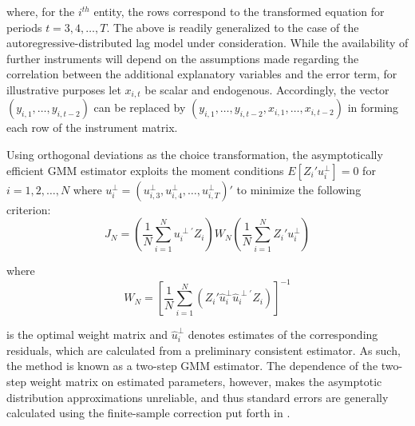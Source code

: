 \documentclass[english]{article}
\begin{document}
\noindent
where, for the $i^{th}$ entity, the rows correspond to the transformed 
equation for periods $t=3,4,\ldots,T$. 
The above is readily generalized to the case of the autoregressive-distributed 
lag model under consideration. 
While the availability of further instruments will depend on the assumptions 
made regarding the correlation between the additional explanatory variables 
and the error term, for illustrative purposes let $x_{i,t}$ be scalar and 
endogenous. 
Accordingly, the vector $(y_{i,1}, \ldots, y_{i,t-2})$ can be replaced by 
$(y_{i,1}, \ldots, y_{i,t-2}, x_{i,1},\ldots,  x_{i,t-2})$ in forming 
each row of the instrument matrix. 

Using orthogonal deviations as the choice transformation, the asymptotically 
efficient GMM estimator exploits the moment conditions 
$E[Z_i' u_i^\perp]=0$ for $i=1,2,\ldots,N$ where $u_i^\perp=
(u_{i,3}^\perp, u_{i,4}^\perp, \ldots , u_{i,T}^\perp)'$ to minimize the 
following criterion:
\begin{equation}
J_N = \left(\frac{1}{N} \sum_{i=1}^N u_{i}^{\perp \prime} Z_i \right) 
W_N \left(\frac{1}{N} \sum _{i=1}^N Z_i' u_i^\perp \right)
\end{equation}

\noindent
where
\begin{equation}
W_N = \left[\frac{1}{N}\sum_{i=1}^N \left(Z_i' \widehat{u}_i^\perp 
\widehat{u}_i^{\perp \prime} Z_i \right)  \right]^{-1}
\end{equation}

\noindent
is the optimal weight matrix and $\widehat{u}_i^\perp$ denotes estimates of 
the corresponding residuals, which are calculated from a preliminary consistent 
estimator. 
As such, the method is known as a two-step GMM estimator. 
The dependence of the two-step weight matrix on estimated parameters, 
however, makes the asymptotic distribution approximations unreliable, and 
thus standard errors are generally calculated using the finite-sample correction 
put forth in \citet{windmeijer2005} 
\citep{arellano1991, bond2002, roodman2009}.
\end{document}
